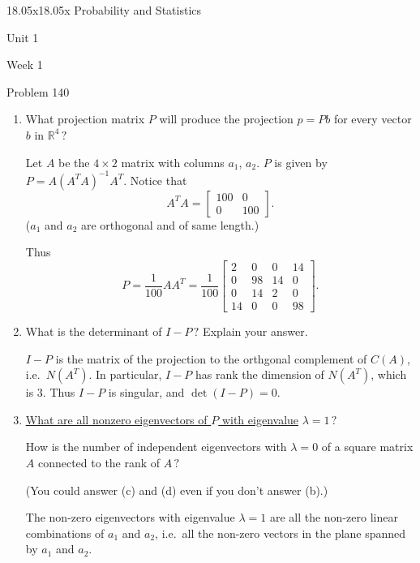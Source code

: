 \begin{edXcourse}{18.05x}{18.05x Probability and Statistics}
\begin{edXchapter}{Unit 1}
\begin{edXsection}{Week 1}
\begin{edXsequential}
\begin{edXproblem}{Problem 1}{40}
\begin{enumerate}
\item What projection matrix $P$ will produce the projection 
$p=Pb$ for every vector $b$ in $\mathbb{R}^{4}\, ?$


\begin{sol}
Let $A$ be the $4 \times 2$ matrix with columns $a_1$, $a_2$. $P$ is given by $P =
A(A^TA)^{-1}A^T$. Notice that
$$
A^T A = 
\begin{bmatrix}
100 & 0 \\
0 & 100
\end{bmatrix}.
$$
($a_1$ and $a_2$ are orthogonal and of same length.)

Thus 
$$
P = \frac{1}{100} AA^T = \frac{1}{100} 
\begin{bmatrix}
2 & 0 & 0 & 14 \\
0 & 98 & 14 & 0 \\
0 & 14 & 2 & 0 \\
14 & 0 & 0 & 98
\end{bmatrix}.
$$
\end{sol}

\newpage
\item What is the determinant of $I - P \, ?$ Explain your answer. 


\begin{sol}

$I-P$ is the matrix of the projection to the orthgonal complement of $C(A)$, i.e.~$N(A^T)$. In particular, $I-P$ has rank the dimension of $N(A^T)$, which is 3. Thus $I-P$ is singular, and $\det(I-P) = 0$. 
\end{sol}

\item \underline{What are all nonzero eigenvectors of $P$ with 
eigenvalue} $\lambda = 1 \, ?$

How is the number of independent eigenvectors
with $\lambda = 0$ of a square matrix $A$ connected to the rank of $A \, ?$ 
\hspace{2em}

 
(You could answer (c) and (d) even if you don't answer (b).)


\begin{sol}
The non-zero eigenvectors with eigenvalue $\lambda = 1$ are all the non-zero linear combinations of $a_1$ and $a_2$, i.e.~all the non-zero vectors in the plane spanned by $a_1$ and $a_2$.


\end{sol}
\end{enumerate}
\end{edXproblem}
\end{edXsequential}
\end{edXsection}
\end{edXchapter}
\end{edXcourse}
